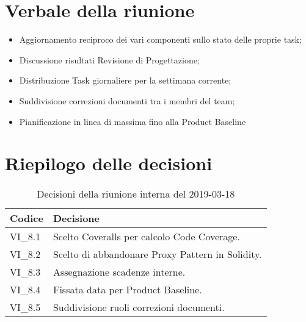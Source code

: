 \section{Verbale della riunione}
\begin{itemize}
	\item Aggiornamento reciproco dei vari componenti sullo stato delle proprie 
	task;
	\item Discussione risultati Revisione di Progettazione;
	\item Distribuzione Task giornaliere per la settimana corrente;
	\item Suddivisione correzioni documenti tra i membri del team;
	\item Pianificazione in linea di massima fino alla Product Baseline
	
\end{itemize}

\hspace{3cm}

\section{Riepilogo delle decisioni}

	
	\begin{longtable}{ >{\centering}p{} >{}p{}}
		\caption{Decisioni della riunione interna del 2019-03-18}\\	
		\rowcolorhead
		\textbf{\color{white}Codice} 
		& \centering\textbf{\color{white}Decisione} 
		\tabularnewline 
		\endfirsthead
		VI\_8.1 & Scelto Coveralls per calcolo Code Coverage.
		\tabularnewline 
		VI\_8.2 & Scelto di abbandonare Proxy Pattern in Solidity.
		\tabularnewline 
		VI\_8.3 & Assegnazione scadenze interne.
		\tabularnewline 
		VI\_8.4 & Fissata data per Product Baseline.
		\tabularnewline
		VI\_8.5 & Suddivisione ruoli correzioni documenti.\\
		
	\end{longtable}
	




